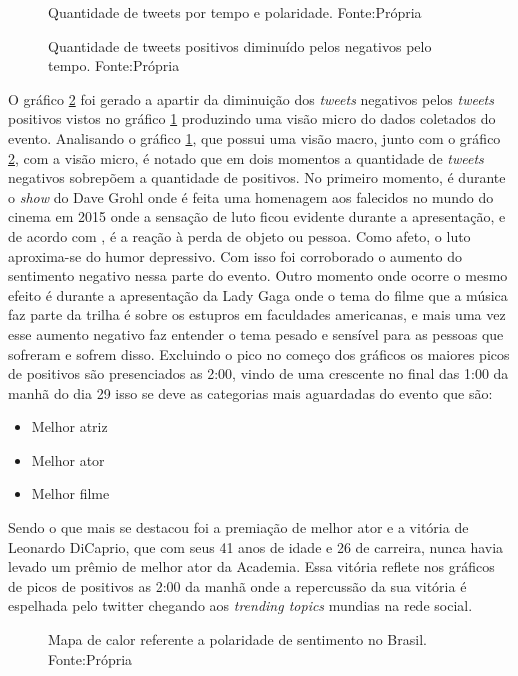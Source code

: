 \begin{figure}[!h]
	\centering{}
	\caption{Quantidade de tweets por tempo e polaridade. Fonte:Própria}
	\label{qtd}
\end{figure}

\begin{figure}[!h]
	\centering{}
	\caption{Quantidade de tweets positivos diminuído pelos negativos pelo tempo. Fonte:Própria}
	\label{qtdnegpos}
\end{figure}

O gráfico \ref{qtdnegpos} foi gerado a apartir da diminuição dos \textit{tweets} negativos pelos \textit{tweets} positivos vistos no gráfico \ref{qtd} produzindo uma visão micro do dados coletados do evento. Analisando o gráfico \ref{qtd}, que possui uma visão macro, junto com o gráfico \ref{qtdnegpos}, com a visão micro, é notado que em dois momentos a quantidade de \textit{tweets} negativos sobrepõem a quantidade de positivos. No primeiro momento, é durante o \textit{show} do Dave Grohl onde é feita uma homenagem aos falecidos no mundo do cinema em 2015 onde a sensação de luto ficou evidente durante a apresentação, e de acordo com \cite{freud1908conferencias}, é a reação à perda de objeto ou pessoa. Como afeto, o luto aproxima-se do humor depressivo. Com isso foi corroborado o aumento do sentimento negativo nessa parte do evento. Outro momento onde ocorre o mesmo efeito é durante a apresentação da Lady Gaga onde o tema do filme que a  música faz parte da trilha é sobre os estupros em faculdades americanas, e mais uma vez esse aumento negativo faz entender o tema pesado e sensível para as pessoas que sofreram e sofrem disso. Excluindo o pico no começo dos gráficos os maiores picos de positivos são presenciados as 2:00, vindo de uma crescente no final das 1:00 da manhã do dia 29 isso se deve as categorias mais aguardadas do evento que são:

 \begin{itemize}
 	\item Melhor atriz
 	\item Melhor ator
 	\item Melhor filme
 \end{itemize}

Sendo o que mais se destacou foi a premiação de melhor ator e a vitória de Leonardo DiCaprio, que com seus 41 anos de idade e 26 de carreira, nunca havia levado um prêmio de melhor ator da Academia. Essa vitória reflete nos gráficos de picos de positivos as 2:00 da manhã onde a repercussão da sua vitória é espelhada pelo twitter chegando aos \textit{trending topics} mundias na rede social.


\begin{figure}[!h]
	\centering{}
	\caption{Mapa de calor referente a polaridade de sentimento no Brasil. Fonte:Própria}
	\label{mapa}
\end{figure}